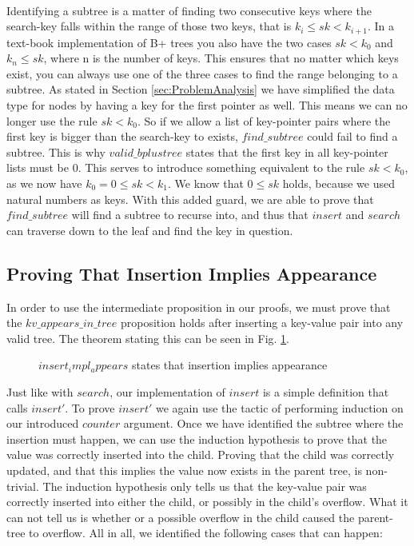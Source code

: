\paragraph{}
Identifying a subtree is a matter of finding two consecutive keys where the search-key falls within the range of those two keys, that is $k_i \le sk < k_{i+1}$. In a text-book implementation of B+ trees you also have the two cases $sk < k_0$ and $k_{n} \le sk$, where n is the number of keys. This ensures that no matter which keys exist, you can always use one of the three cases to find the range belonging to a subtree. As stated in Section \ref{sec:ProblemAnalysis} we have simplified the data type for nodes by having a key for the first pointer as well. This means we can no longer use the rule $sk < k_0$. So if we allow a list of key-pointer pairs where the first key is bigger than the search-key to exists, $find\_subtree$ could fail to find a subtree. This is why $valid\_bplustree$ states that the first key in all key-pointer lists must be 0. This serves to introduce something equivalent to the rule $sk < k_0$, as we now have $k_0 = 0 \le sk < k_1$. We know that $0 \le sk$ holds, because we used natural numbers as keys. With this added guard, we are able to prove that $find\_subtree$ will find a subtree to recurse into, and thus that $insert$ and $search$ can traverse down to the leaf and find the key in question.

\subsection{Proving That Insertion Implies Appearance}
\label{sec:proving_insert_appears}
In order to use the intermediate proposition in our proofs, we must prove that the $kv\_appears\_in\_tree$ proposition holds after inserting a key-value pair into any valid tree. The theorem stating this can be seen in Fig. \ref{fig:insert_impl_appears}.

\begin{figure}
  
  \caption{$insert_impl_appears$ states that insertion implies appearance}
  \label{fig:insert_impl_appears}
\end{figure}

Just like with $search$, our implementation of $insert$ is a simple definition that calls $insert'$. To prove $insert'$ we again use the tactic of performing induction on our introduced $counter$ argument. Once we have identified the subtree where the insertion must happen, we can use the induction hypothesis to prove that the value was correctly inserted into the child. Proving that the child was correctly updated, and that this implies the value now exists in the parent tree, is non-trivial. The induction hypothesis only tells us that the key-value pair was correctly inserted into either the child, or possibly in the child's overflow. What it can not tell us is whether or a possible overflow in the child caused the parent-tree to overflow. All in all, we identified the following cases that can happen:

